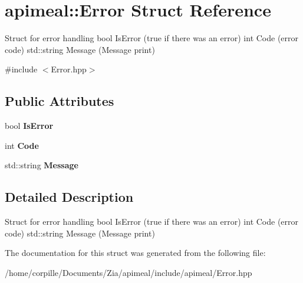 \hypertarget{structapimeal_1_1Error}{\section{apimeal\-:\-:Error Struct Reference}
\label{structapimeal_1_1Error}
}


Struct for error handling bool Is\-Error (true if there was an error) int Code (error code) std\-::string Message (Message print)  




{\ttfamily \#include $<$Error.\-hpp$>$}

\subsection*{Public Attributes}
\begin{DoxyCompactItemize}
\item 
\hypertarget{structapimeal_1_1Error_a478d14ea80925fae993aa652b8dc6fb4}{bool {\bfseries Is\-Error}}\label{structapimeal_1_1Error_a478d14ea80925fae993aa652b8dc6fb4}

\item 
\hypertarget{structapimeal_1_1Error_a4dd936b868553fca14e910c33bb81bc2}{int {\bfseries Code}}\label{structapimeal_1_1Error_a4dd936b868553fca14e910c33bb81bc2}

\item 
\hypertarget{structapimeal_1_1Error_a28eff246cdeb42c782cb207e4e535472}{std\-::string {\bfseries Message}}\label{structapimeal_1_1Error_a28eff246cdeb42c782cb207e4e535472}

\end{DoxyCompactItemize}


\subsection{Detailed Description}
Struct for error handling bool Is\-Error (true if there was an error) int Code (error code) std\-::string Message (Message print) 

The documentation for this struct was generated from the following file\-:\begin{DoxyCompactItemize}
\item 
/home/corpille/\-Documents/\-Zia/apimeal/include/apimeal/Error.\-hpp\end{DoxyCompactItemize}

